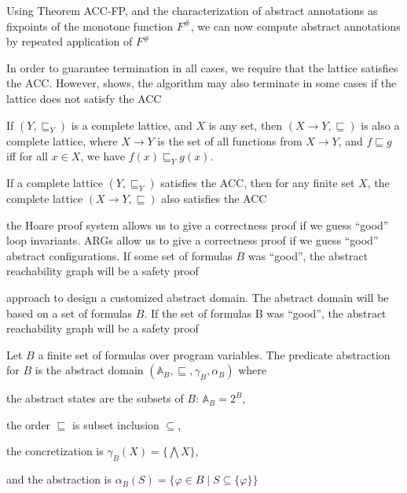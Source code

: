 \documentclass[landscape, a4paper]{article}
\begin{document}
\begin{minipage}[t]{0.2\linewidth}
\begin{betterlist}
		\item Using Theorem ACC-FP, and the characterization of abstract annotations as fixpoints of the monotone function $F^\#$, we can now compute abstract annotations by repeated application of $F^\#$
		\begin{betterlist}
			\item In order to guarantee termination in all cases, we require that the lattice satisfies the ACC. However,  shows, the algorithm may also terminate in some cases if the lattice does not satisfy the ACC
		\end{betterlist}
		\item If $(Y, \sqsubseteq_Y)$ is a complete lattice, and $X$ is any set, then $(X\rightarrow Y, \sqsubseteq)$ is also a complete lattice, where $X \rightarrow Y$ is the set of all functions from $X \rightarrow Y$, and $f \sqsubseteq g$ iff for all $x \in X$, we have $f(x) \sqsubseteq_Y g(x)$. \script{429}{Proof}
		\item If a complete lattice $(Y , \sqsubseteq_Y)$ satisfies the ACC, then for any finite set $X$, the complete lattice $(X \rightarrow Y , \sqsubseteq)$ also satisfies the ACC
	\end{betterlist}
	\fbox{Predicate Abstraction}
	\begin{betterlist}
		\item the Hoare proof system allows us to give a correctness proof if we guess \enquote{good} loop invariants. ARGs allow us to give a correctness proof if we guess \enquote{good} abstract configurations. If some set of formulas $B$ was \enquote{good}, the abstract reachability graph will be a safety proof
		\item approach to design a customized abstract domain. The abstract domain will be based on a set of formulas $B$. If the set of formulas B was \enquote{good}, the abstract reachability graph will be a safety proof
		\item \color{orange}Let $B$ a finite set of formulas over program variables. The \alert{predicate abstraction for $B$} is the abstract domain $(\mathbb{A}_B, \sqsubseteq, \gamma_B, \alpha_B)$ where
		\begin{betterlist}
			\item the abstract states are the subsets of $B$: $\mathbb{A}_B = 2^B$,
			\item the order $\sqsubseteq$ is subset inclusion $\subseteq$,
			\item the concretization is $\gamma_B(X) = \{\bigwedge X\}$,
			\item and the abstraction is $\alpha_B(S) = \{\varphi \in B \mid S \subseteq \{\varphi\}\}$

\end{betterlist}
\end{betterlist}
\end{minipage}
\end{document}
